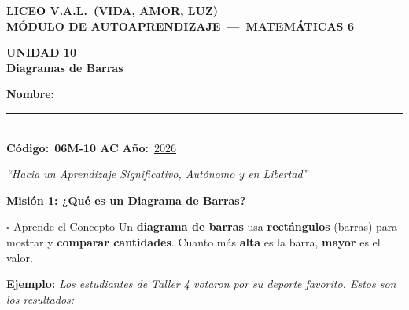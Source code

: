 \documentclass[12pt,letterpaper]{article}
\newcommand{\mision}[2]{%
	\needspace{4cm}%
	\vspace{4pt}%
	\begin{tcolorbox}[
		enhanced, colback=#1, colframe=#1!60!black, arc=3mm, boxrule=1.5pt,
		left=6pt, right=6pt, top=4pt, bottom=4pt,
		]
		{\large\bfseries\color{white} #2}
	\end{tcolorbox}%
	\vspace{2pt}%
}
\begin{document}
	
\begin{center}
	{\Large\bfseries\color{valblue} LICEO V.A.L.\ (VIDA, AMOR, LUZ)}\\[4pt]
	{\large\bfseries MÓDULO DE AUTOAPRENDIZAJE\ ---\ MATEMÁTICAS 6\textdegree}\\[8pt]
	\begin{tcolorbox}[enhanced,arc=6mm,boxrule=2pt,
		colback=valblue,colframe=valdark,halign=center]
		{\Huge\bfseries\color{white} UNIDAD 10}\\[4pt]
		{\Large\bfseries\color{yellow!90!white} Diagramas de Barras}
	\end{tcolorbox}
	\begin{tcolorbox}[enhanced,arc=4mm,boxrule=1.5pt,
		colback=white,colframe=valblue,width=0.88\linewidth,halign=center]
		{\bfseries Nombre:}\\[6pt]
		\rule{9cm}{0.5pt}\\[6pt]
		{\bfseries Código:}\ \textbf{06M-10 AC}
		\hspace{2cm}
		{\bfseries Año:}\ \underline{2026}
	\end{tcolorbox}
	{\itshape ``Hacia un Aprendizaje Significativo, Autónomo y en Libertad''}
\end{center}
	
	\mision{valblue}{Misión 1: ¿Qué es un Diagrama de Barras?}
	
	\begin{concepto}{$\square$ Aprende el Concepto}
	Un \textbf{diagrama de barras} usa \textbf{rectángulos} (barras) para
	mostrar y \textbf{comparar cantidades}.
	Cuanto más \textbf{alta} es la barra, \textbf{mayor} es el valor.
	
	\vspace{6pt}
	\textbf{Ejemplo: }\textit{Los estudiantes de Taller 4 votaron por su deporte favorito.
		Estos son los resultados:}
	\end{concepto}
	
\end{document}
